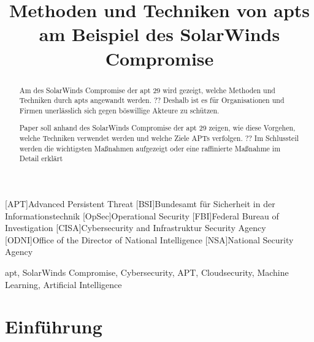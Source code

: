 \documentclass[conference]{IEEEtran}
\begin{document}
\begin{acronym}
    [APT]{Advanced Persistent Threat}
    [BSI]{Bundesamt für Sicherheit in der Informationstechnik}
    [OpSec]{Operational Security}
    [FBI]{Federal Bureau of Investigation}
    [CISA]{Cybersecurity and Infrastruktur Security Agency}
    [ODNI]{Office of the Director of National Intelligence}
    [NSA]{National Security Agency}
\end{acronym}


\title{Methoden und Techniken von \aclp*{apt} am Beispiel des SolarWinds Compromise
}

\author{
}

\maketitle

\begin{abstract}
    Am des SolarWinds Compromise der \acs*{apt} 29 wird gezeigt, welche Methoden und Techniken durch \acsp*{apt} angewandt werden.
    ?? Deshalb ist es für Organisationen und Firmen unerlässlich sich gegen böswillige Akteure zu schützen.

    Paper soll anhand des SolarWinds Compromise der \ac{apt} 29 zeigen, wie diese Vorgehen, welche Techniken verwendet werden und welche Ziele APTs verfolgen.
    ?? Im Schlussteil werden die wichtigsten Maßnahmen aufgezeigt oder eine raffinierte Maßnahme im Detail erklärt
\end{abstract}

\begin{IEEEkeywords}
    \ac{apt}, SolarWinds Compromise, Cybersecurity, APT, Cloudsecurity, Machine Learning, Artificial Intelligence
\end{IEEEkeywords}

\section{Einführung}
\label{sec:introduction}
\end{document}
